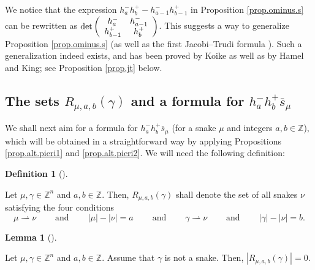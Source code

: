 \documentclass[numbers=enddot,12pt,final,onecolumn,notitlepage]{scrartcl}%
\theoremstyle{definition}
\newtheorem{lem}[theo]{Lemma}
\newenvironment{lemma}[1][]
{\begin{lem}[#1]\begin{leftbar}}
{\end{leftbar}\end{lem}}
\newtheorem{defi}[theo]{Definition}
\newenvironment{definition}[1][]
{\begin{defi}[#1]\begin{leftbar}}
{\end{leftbar}\end{defi}}
\begin{document}
We notice that the expression $h_{a}^{-}h_{b}^{+}-h_{a-1}^{-}h_{b-1}^{+}$ in
Proposition \ref{prop.ominus.s} can be rewritten as $\det\left(
\begin{array}
[c]{cc}%
h_{a}^{-} & h_{a-1}^{-}\\
h_{b-1}^{+} & h_{b}^{+}%
\end{array}
\right)  $. This suggests a way to generalize Proposition \ref{prop.ominus.s}
(as well as the first Jacobi--Trudi formula \cite[(2.4.16)]{GriRei}). Such a
generalization indeed exists, and has been proved by Koike as well as by Hamel
and King; see Proposition \ref{prop.jt} below.

\subsection{The sets $R_{\mu,a,b}\left(  \gamma\right)  $ and a formula for
$h_{a}^{-}h_{b}^{+}\overline{s}_{\mu}$}

We shall next aim for a formula for $h_{a}^{-}h_{b}^{+}\overline{s}_{\mu}$
(for a snake $\mu$ and integers $a,b\in\mathbb{Z}$), which will be obtained in
a straightforward way by applying Propositions \ref{prop.alt.pieri1} and
\ref{prop.alt.pieri2}. We will need the following definition:

\begin{definition}
\label{def.Rmab}Let $\mu,\gamma\in\mathbb{Z}^{n}$ and $a,b\in\mathbb{Z}$.
Then, $R_{\mu,a,b}\left(  \gamma\right)  $ shall denote the set of all snakes
$\nu$ satisfying the four conditions%
\[
\mu\rightharpoonup\nu\ \ \ \ \ \ \ \ \ \ \text{and}%
\ \ \ \ \ \ \ \ \ \ \left\vert \mu\right\vert -\left\vert \nu\right\vert
=a\ \ \ \ \ \ \ \ \ \ \text{and}\ \ \ \ \ \ \ \ \ \ \gamma\rightharpoonup
\nu\ \ \ \ \ \ \ \ \ \ \text{and}\ \ \ \ \ \ \ \ \ \ \left\vert \gamma
\right\vert -\left\vert \nu\right\vert =b.
\]

\end{definition}

\begin{lemma}
\label{lem.Rmab.0}Let $\mu,\gamma\in\mathbb{Z}^{n}$ and $a,b\in\mathbb{Z}$.
Assume that $\gamma$ is not a snake. Then, $\left\vert R_{\mu,a,b}\left(
\gamma\right)  \right\vert =0$.
\end{lemma}
\end{document}
